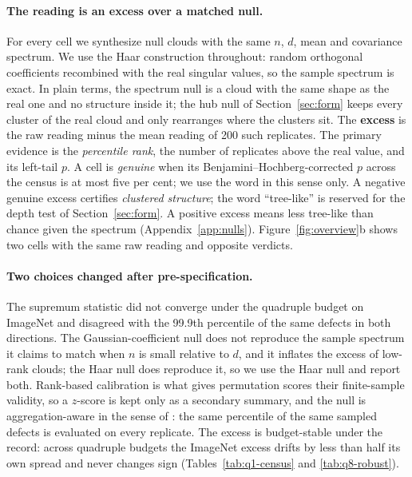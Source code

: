 \documentclass{article}
\begin{document}
\paragraph{The reading is an excess over a matched null.} For every cell we synthesize null clouds with the same $n$, $d$, mean and covariance spectrum. We use the Haar construction throughout: random orthogonal coefficients recombined with the real singular values, so the sample spectrum is exact. In plain terms, the spectrum null is a cloud with the same shape as the real one and no structure inside it; the hub null of Section~\ref{sec:form} keeps every cluster of the real cloud and only rearranges where the clusters sit. The \textbf{excess} is the raw reading minus the mean reading of 200 such replicates. The primary evidence is the \emph{percentile rank}, the number of replicates above the real value, and its left-tail $p$. A cell is \emph{genuine} when its Benjamini--Hochberg-corrected $p$ across the census is at most five per cent; we use the word in this sense only. A negative genuine excess certifies \emph{clustered structure}; the word ``tree-like'' is reserved for the depth test of Section~\ref{sec:form}. A positive excess means less tree-like than chance given the spectrum (Appendix~\ref{app:nulls}). Figure~\ref{fig:overview}b shows two cells with the same raw reading and opposite verdicts.

\paragraph{Two choices changed after pre-specification.} The supremum statistic did not converge under the quadruple budget on ImageNet and disagreed with the 99.9th percentile of the same defects in both directions. The Gaussian-coefficient null does not reproduce the sample spectrum it claims to match when $n$ is small relative to $d$, and it inflates the excess of low-rank clouds; the Haar null does reproduce it, so we use the Haar null and report both. Rank-based calibration is what gives permutation scores their finite-sample validity, so a $z$-score is kept only as a secondary summary, and the null is aggregation-aware in the sense of \citet[\S5]{groger2026aristotelian}: the same percentile of the same sampled defects is evaluated on every replicate. The excess is budget-stable under the record: across quadruple budgets the ImageNet excess drifts by less than half its own spread and never changes sign (Tables~\ref{tab:q1-census} and \ref{tab:q8-robust}). %
\end{document}
